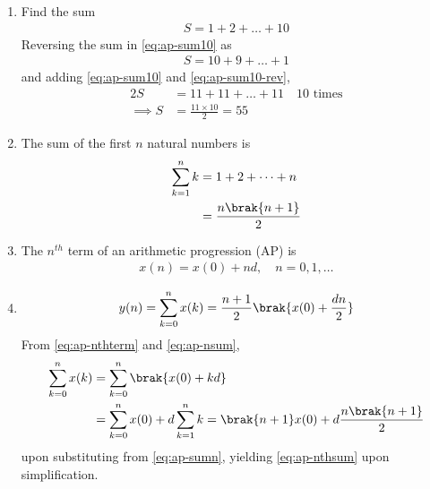 \begin{enumerate}[label=\thesubsection.\arabic*,ref=\thesubsection.\theenumi]
	\item Find the sum
\begin{align}
	\label{eq:ap-sum10}
	S = 1 + 2 + \dots + 10
\end{align}
\solution Reversing the sum in
	\eqref{eq:ap-sum10}
	as
\begin{align}
	\label{eq:ap-sum10-rev}
	S = 10 + 9 + \dots + 1
\end{align}
and adding 
	\eqref{eq:ap-sum10}
	and
	\eqref{eq:ap-sum10-rev},
\begin{align}
	\label{eq:ap-sum10-add}
	2S &= 11 + 11 + \dots + 11 \quad 10 \text{ times}
	\\
	\implies S &= \frac{11 \times 10}{2} = 55
\end{align}
\item The sum of the first $n$ natural numbers is
\begin{align}
	\sum_{k=1}^{n}k &= 1+ 2 + \dots + n
	\\
	&= \frac{n\brak{n+1}}{2}
	\label{eq:ap-sumn}
\end{align}
\item The $n^{th}$ term of an arithmetic progression (AP) is
\begin{align}
	\label{eq:ap-nthterm}
	x(n) = x(0) + nd, \quad n = 0, 1, \dots
\end{align}
\item 
\begin{align}
	\label{eq:ap-nsum}
	 y(n)=\sum_{k=0}^{n}x(k) = \frac{n+1}{2}\brak{x(0) + \frac{dn}{2}}
\end{align}
\solution
From
	\eqref{eq:ap-nthterm}
	and
	\eqref{eq:ap-nsum},
\begin{align}
	\label{eq:ap-nthsum}
	 \sum_{k=0}^{n}x(k) &= 
\sum_{k=0}^{n}
	 \brak{x(0) + kd} 
	 \\
	 &= 
\sum_{k=0}^{n}x(0) + 
d\sum_{k=1}^{n}k
	  = \brak{n+1}x(0) + d\frac{n\brak{n+1}}{2}
\end{align}
upon substituting from
	\eqref{eq:ap-sumn}, yielding
	\eqref{eq:ap-nthsum}
	upon simplification.
\end{enumerate}
